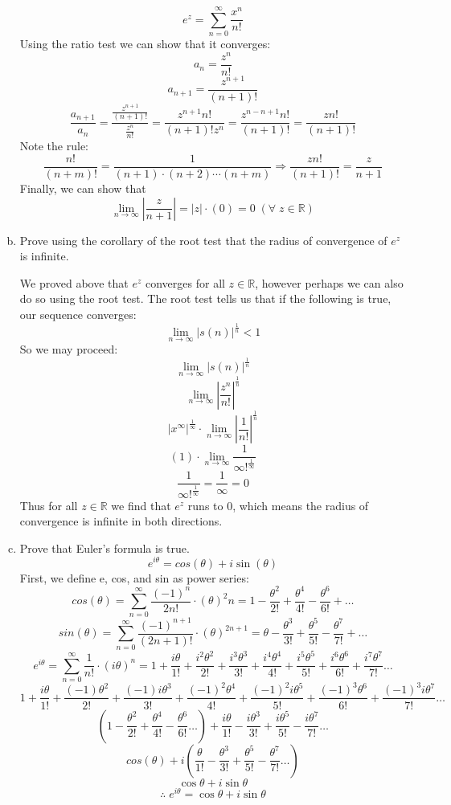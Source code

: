 \documentclass{article}
\begin{document}
\begin{enumerate}[a.]
	\[e^z=\sum_{n=0}^{\infty}\frac{x^n}{n!}\]
	Using the ratio test we can show that it converges:
	\[a_n=\frac{z^n}{n!} \]
	\[a_{n+1}=\frac{z^{n+1}}{(n+1)!}\]
	\[\frac{a_{n+1}}{a_n}=\frac{\frac{z^{n+1}}{(n+1)!}}{\frac{z^n}{n!}} = \frac{z^{n+1}n!}{\left(n+1\right)!z^n}=\frac{z^{n-n+1}n!}{\left(n+1\right)!}=\frac{zn!}{\left(n+1\right)!}\]
	Note the rule:
	\[\frac{n!}{\left(n+m\right)!}=\frac{1}{\left(n+1\right)\cdot \left(n+2\right)\cdots \left(n+m\right)} \Rightarrow \frac{zn!}{\left(n+1\right)!}=\frac{z}{n+1}\]
	Finally, we can show that
	\[\lim_{n\to\infty}|\frac{z}{n+1}|=|z|\cdot(0)=0  \; (\forall \;  z \in \mathbb{R})\]
	\item Prove using the corollary of the root test that the radius of convergence of $e^z$ is infinite.

	We proved above that $e^z$ converges for all $z\in\mathbb{R}$, however perhaps we can also do so using the root test. The root test tells us that if the following is true, our sequence converges:
	\[\lim_{n\to\infty}|s(n)|^\frac{1}{n} < 1 \]
	So we may proceed:
	\[\lim_{n\to\infty}|s(n)|^\frac{1}{n}\]
	\[\lim_{n\to\infty}|\frac{z^n}{n!}|^\frac{1}{n}\]
	\[|x^\infty|^{\frac{1}{\infty}}\cdot\lim_{n\to\infty}|\frac{1}{n!}|^\frac{1}{n}\]
	\[(1)\cdot\lim_{n\to\infty}\frac{1}{\infty!^\frac{1}{\infty}}\]
	\[\frac{1}{\infty!^\frac{1}{\infty}}=\frac{1}{\infty}=0\]
	Thus for all $z\in\mathbb{R}$ we find that $e^z$ runs to 0, which means the radius of convergence is infinite in both directions.

	\item Prove that Euler's formula is true.
	\[e^{i\theta} = cos(\theta) + i\sin(\theta)\]
    First, we define e, cos, and sin as power series:
    \[cos(\theta) = \sum_{n=0}^{\infty} \frac{(-1)^n}{2n!} \cdot (\theta)^2n = 1-\frac{\theta^2}{2!}+\frac{\theta^4}{4!}-\frac{\theta^6}{6!}+\dots\]
    \[sin(\theta) = \sum_{n=0}^{\infty} \frac{(-1)^{n+1}}{(2n+1)!} \cdot (\theta)^{2n+1} = \theta-\frac{\theta^3}{3!}+\frac{\theta^5}{5!}-\frac{\theta^7}{7!}+\dots\]
    \[e^{i\theta} = \sum_{n=0}^{\infty} \frac{1}{n!} \cdot (i\theta)^n = 1+\frac{i\theta}{1!}+\frac{i^2\theta^2}{2!}+\frac{i^3\theta^3}{3!}+\frac{i^4\theta^4}{4!}+\frac{i^5\theta^5}{5!}+\frac{i^6\theta^6}{6!}+\frac{i^7\theta^7}{7!}\dots\]
    \[1+\frac{i\theta}{1!}+\frac{(-1)\theta^2}{2!}+\frac{(-1)i\theta^3}{3!}+\frac{(-1)^2\theta^4}{4!}+\frac{(-1)^2i\theta^5}{5!}+\frac{(-1)^3\theta^6}{6!}+\frac{(-1)^3i\theta^7}{7!}\dots\]
    \[(1-\frac{\theta^2}{2!}+\frac{\theta^4}{4!}-\frac{\theta^6}{6!}\dots)+\frac{i\theta}{1!}-\frac{i\theta^3}{3!}+\frac{i\theta^5}{5!}-\frac{i\theta^7}{7!}\dots\]
    \[cos(\theta)+i(\frac{\theta}{1!}-\frac{\theta^3}{3!}+\frac{\theta^5}{5!}-\frac{\theta^7}{7!}\dots)\]
    \[\cos{\theta}+i\sin{\theta} \]
	\[\therefore \; e^{i\theta}=\cos{\theta}+i\sin{\theta} \]

\end{enumerate}
\end{document}
